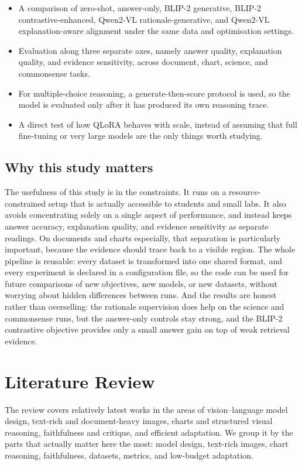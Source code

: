 \documentclass[preprint,12pt]{elsarticle}
\begin{document}
\begin{itemize}
    \item A comparison of zero-shot, answer-only, BLIP-2 generative, BLIP-2 contrastive-enhanced, Qwen2-VL rationale-generative, and Qwen2-VL explanation-aware alignment under the same data and optimisation settings.
    \item Evaluation along three separate axes, namely answer quality, explanation quality, and evidence sensitivity, across document, chart, science, and commonsense tasks.
    \item For multiple-choice reasoning, a generate-then-score protocol is used, so the model is evaluated only after it has produced its own reasoning trace.
    \item A direct test of how QLoRA behaves with scale, instead of assuming that full fine-tuning or very large models are the only things worth studying.
\end{itemize}

\subsection{Why this study matters}
The usefulness of this study is in the constraints.
It runs on a resource-constrained setup that is actually accessible to students and small labs.
It also avoids concentrating solely on a single aspect of performance, and instead keeps answer accuracy, explanation quality, and evidence sensitivity as separate readings.
On documents and charts especially, that separation is particularly important, because the evidence should trace back to a visible region.
The whole pipeline is reusable: every dataset is transformed into one shared format, and every experiment is declared in a configuration file,
so the code can be used for future comparisons of new objectives, new models, or new datasets, without worrying about hidden differences between runs.
And the results are honest rather than overselling: the rationale supervision does help on the science and commonsense runs, but the answer-only controls stay strong,
and the BLIP-2 contrastive objective provides only a small answer gain on top of weak retrieval evidence.

\section{Literature Review}
The review covers relatively latest works in the areas of vision--language model design,
text-rich and document-heavy images, charts and structured visual reasoning, faithfulness and critique, and efficient adaptation.
We group it by the parts that actually matter here the most: model design, text-rich images, chart reasoning, faithfulness, datasets, metrics, and low-budget adaptation.
\end{document}
